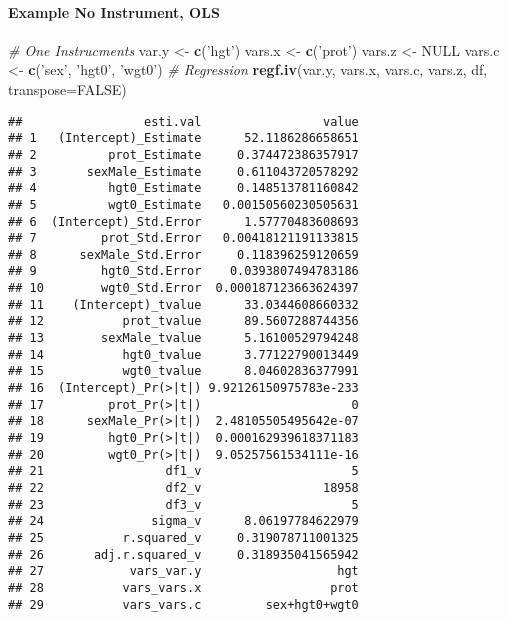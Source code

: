 \documentclass[
]{book}
\newenvironment{Shaded}{\begin{snugshade}}{\end{snugshade}}
\newcommand{\CommentTok}[1]{\textcolor[rgb]{0.56,0.35,0.01}{\textit{#1}}}
\newcommand{\DataTypeTok}[1]{\textcolor[rgb]{0.13,0.29,0.53}{#1}}
\newcommand{\KeywordTok}[1]{\textcolor[rgb]{0.13,0.29,0.53}{\textbf{#1}}}
\newcommand{\NormalTok}[1]{#1}
\newcommand{\OtherTok}[1]{\textcolor[rgb]{0.56,0.35,0.01}{#1}}
\newcommand{\StringTok}[1]{\textcolor[rgb]{0.31,0.60,0.02}{#1}}
\begin{document}
\hypertarget{example-no-instrument-ols}{%
\paragraph{Example No Instrument, OLS}\label{example-no-instrument-ols}}

\begin{Shaded}
\begin{Highlighting}[]
\CommentTok{# One Instrucments}
\NormalTok{var.y <-}\StringTok{ }\KeywordTok{c}\NormalTok{(}\StringTok{'hgt'}\NormalTok{)}
\NormalTok{vars.x <-}\StringTok{ }\KeywordTok{c}\NormalTok{(}\StringTok{'prot'}\NormalTok{)}
\NormalTok{vars.z <-}\StringTok{ }\OtherTok{NULL}
\NormalTok{vars.c <-}\StringTok{ }\KeywordTok{c}\NormalTok{(}\StringTok{'sex'}\NormalTok{, }\StringTok{'hgt0'}\NormalTok{, }\StringTok{'wgt0'}\NormalTok{)}
\CommentTok{# Regression}
\KeywordTok{regf.iv}\NormalTok{(var.y, vars.x, vars.c, vars.z, df, }\DataTypeTok{transpose=}\OtherTok{FALSE}\NormalTok{)}
\end{Highlighting}
\end{Shaded}

\begin{verbatim}
##                 esti.val                 value
## 1   (Intercept)_Estimate      52.1186286658651
## 2          prot_Estimate     0.374472386357917
## 3       sexMale_Estimate     0.611043720578292
## 4          hgt0_Estimate     0.148513781160842
## 5          wgt0_Estimate   0.00150560230505631
## 6  (Intercept)_Std.Error      1.57770483608693
## 7         prot_Std.Error   0.00418121191133815
## 8      sexMale_Std.Error     0.118396259120659
## 9         hgt0_Std.Error    0.0393807494783186
## 10        wgt0_Std.Error  0.000187123663624397
## 11    (Intercept)_tvalue      33.0344608660332
## 12           prot_tvalue      89.5607288744356
## 13        sexMale_tvalue      5.16100529794248
## 14           hgt0_tvalue      3.77122790013449
## 15           wgt0_tvalue      8.04602836377991
## 16  (Intercept)_Pr(>|t|) 9.92126150975783e-233
## 17         prot_Pr(>|t|)                     0
## 18      sexMale_Pr(>|t|)  2.48105505495642e-07
## 19         hgt0_Pr(>|t|)  0.000162939618371183
## 20         wgt0_Pr(>|t|)  9.05257561534111e-16
## 21                 df1_v                     5
## 22                 df2_v                 18958
## 23                 df3_v                     5
## 24               sigma_v      8.06197784622979
## 25           r.squared_v     0.319078711001325
## 26       adj.r.squared_v     0.318935041565942
## 27            vars_var.y                   hgt
## 28           vars_vars.x                  prot
## 29           vars_vars.c         sex+hgt0+wgt0
\end{verbatim}
\end{document}
